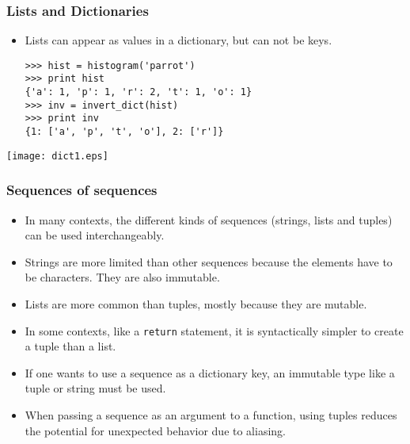 \documentclass{beamer}
\newcommand{\beforeverb}{\footnotesize}
\newcommand{\afterverb}{\normalsize}
\begin{document}
\begin{frame}[fragile]
\frametitle{Lists and Dictionaries}
\begin{itemize}
\item Lists can appear as \alert{values} in a dictionary, but can not be \alert{keys}.
\beforeverb
\begin{verbatim}
>>> hist = histogram('parrot')
>>> print hist
{'a': 1, 'p': 1, 'r': 2, 't': 1, 'o': 1}
>>> inv = invert_dict(hist)
>>> print inv
{1: ['a', 'p', 't', 'o'], 2: ['r']}
\end{verbatim}
\afterverb
\end{itemize}
\centerline{\texttt{[image: dict1.eps]}}
\end{frame}
\begin{frame}[fragile]
\frametitle{Sequences of sequences}
\begin{itemize}
\item In many contexts, the different kinds of sequences (strings, lists and
tuples) can be used interchangeably.
\item  Strings are \alert{more limited} than other
sequences because the elements have to be \alert{characters}.  They are
also \alert{immutable}.  
\item Lists are more common than tuples, mostly because they are \alert{mutable}.
\item In some contexts, like a {\tt return} statement, it is
syntactically simpler to create a \alert{tuple} than a list.  

\item If one wants to use a sequence as a dictionary key,  an \alert{immutable} type like a tuple or string must be used.

\item When passing a sequence as an argument to a function,
using \alert{tuples} reduces the potential for unexpected behavior
due to aliasing.
\end{itemize}
\end{frame}
\end{document}
